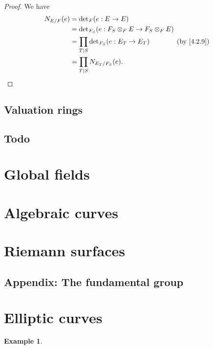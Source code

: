 \documentclass[10pt]{article}
\theoremstyle{definition}
\newtheorem{exam}[theo]{Example}
\begin{document}
\begin{proof}
We have
\begin{align*}
N_{E/F}(e) 
&= \det{}_{\!F}(e : E \to E)
\\
&= \det{}_{\!F_S} (e : F_S \otimes_F E \to F_S \otimes_F E)
\\
&= \prod_{T \mid S} \det{}_{\!F_S}(e : E_T \to E_T)
\qquad\qquad\text{(by \eqref{4.2.9})}
\\
&= \prod_{T \mid S} N_{E_T/F_S}(e).
\qedhere
\end{align*}
\end{proof}



\subsection{Valuation rings}
\label{ch:4.3}





\subsection{Todo}
\label{ch:4.7}

\section{Global fields}
\label{ch:5}

\section{Algebraic curves}
\label{ch:6}

\section{Riemann surfaces}
\label{ch:7}

\subsection{Appendix: The fundamental group}
\label{ch:7.8}

\section{Elliptic curves}
\label{ch:8}

\begin{exam}
\label{8.3.2}
\end{exam}
\end{document}
